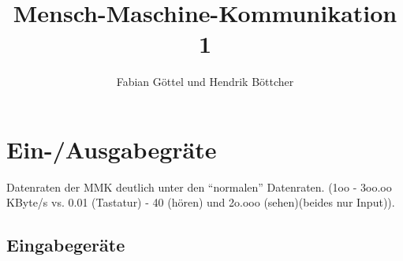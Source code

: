 \documentclass[german,color,6pt]{latex4ei/latex4ei_sheet}
\title{Mensch-Maschine-Kommunikation 1}
\author{Fabian Göttel und Hendrik Böttcher}
\makeatletter
\renewcommand\paragraph{\@startsection{paragraph}{4}{\z@}%
                                    {3.25ex \@plus1ex \@minus.2ex}%
                                    {-1em}%
                                    {\normalfont\normalsize\bfseries}}
\makeatother
\begin{document}
\ifdefined\GitRevision{}\fi


\maketitle




\section{Ein-/Ausgabegräte}
\begin{symbolbox}
Datenraten der MMK deutlich unter den "`normalen"' Datenraten. (1oo - 3oo.oo KByte/s vs. 0.01 (Tastatur) - 40 (hören) und 2o.ooo (sehen)(beides nur Input)).
\end{symbolbox}

\subsection{Eingabegeräte}
\end{document}
